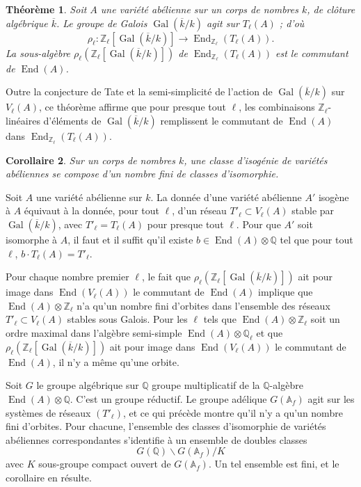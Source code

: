 \documentclass[12pt,a4paper]{article}
\theoremstyle{plain}
\newtheorem{theorem}{Théorème}[section]
\newtheorem{corollary}[theorem]{Corollaire}
\theoremstyle{definition}
\theoremstyle{remark}
\DeclareMathOperator{\End}{End}
\DeclareMathOperator{\Gal}{Gal}
\newcommand{\QQ}{\mathbb{Q}}
\newcommand{\ZZ}{\mathbb{Z}}
\providecommand{\AA}{\mathbb{A}}
\providecommand{\QQ}{\mathbb{Q}}
\providecommand{\ZZ}{\mathbb{Z}}
\providecommand{\End}{\operatorname{End}}
\providecommand{\Gal}{\operatorname{Gal}}
\begin{document}
\begin{theorem}
Soit $A$ une variété abélienne sur un corps de nombres $k$, de clôture algébrique $\overline{k}$. Le groupe de Galois $\Gal(\overline{k}/k)$ agit sur $T_\ell(A)$ ; d'où
\[
\rho_\ell : \ZZ_\ell[\Gal(\overline{k}/k)] \longrightarrow \End_{\ZZ_\ell}(T_\ell(A)).
\]
La sous-algèbre $\rho_\ell(\ZZ_\ell[\Gal(\overline{k}/k)])$ de $\End_{\ZZ_\ell}(T_\ell(A))$ est le commutant de $\End(A)$.
\end{theorem}

Outre la conjecture de Tate et la semi-simplicité de l'action de $\Gal(\overline{k}/k)$ sur $V_\ell(A)$, ce théorème affirme que pour presque tout $\ell$, les combinaisons $\ZZ_\ell$-linéaires d'éléments de $\Gal(\overline{k}/k)$ remplissent le commutant de $\End(A)$ dans $\End_{\ZZ_\ell}(T_\ell(A))$.

\begin{corollary}
Sur un corps de nombres $k$, une classe d'isogénie de variétés abéliennes se compose d'un nombre fini de classes d'isomorphie.
\end{corollary}

Soit $A$ une variété abélienne sur $k$. La donnée d'une variété abélienne $A'$ isogène à $A$ équivaut à la donnée, pour tout $\ell$, d'un réseau $T'_\ell \subset V_\ell(A)$ stable par $\Gal(\overline{k}/k)$, avec $T'_\ell = T_\ell(A)$ pour presque tout $\ell$. Pour que $A'$ soit isomorphe à $A$, il faut et il suffit qu'il existe $b \in \End(A) \otimes \QQ$ tel que pour tout $\ell$, $b \cdot T_\ell(A) = T'_\ell$.

Pour chaque nombre premier $\ell$, le fait que $\rho_\ell(\ZZ_\ell[\Gal(\overline{k}/k)])$ ait pour image dans $\End(V_\ell(A))$ le commutant de $\End(A)$ implique que $\End(A) \otimes \ZZ_\ell$ n'a qu'un nombre fini d'orbites dans l'ensemble des réseaux $T'_\ell \subset V_\ell(A)$ stables sous Galois. Pour les $\ell$ tels que $\End(A) \otimes \ZZ_\ell$ soit un ordre maximal dans l'algèbre semi-simple $\End(A) \otimes \QQ_\ell$ et que $\rho_\ell(\ZZ_\ell[\Gal(\overline{k}/k)])$ ait pour image dans $\End(V_\ell(A))$ le commutant de $\End(A)$, il n'y a même qu'une orbite.

Soit $G$ le groupe algébrique sur $\QQ$ groupe multiplicatif de la $\QQ$-algèbre $\End(A) \otimes \QQ$. C'est un groupe réductif. Le groupe adélique $G(\AA_f)$ agit sur les systèmes de réseaux $(T'_\ell)$, et ce qui précède montre qu'il n'y a qu'un nombre fini d'orbites. Pour chacune, l'ensemble des classes d'isomorphie de variétés abéliennes correspondantes s'identifie à un ensemble de doubles classes
\[
G(\QQ) \backslash G(\AA_f) / K
\]
avec $K$ sous-groupe compact ouvert de $G(\AA_f)$. Un tel ensemble est fini, et le corollaire en résulte.
\end{document}
